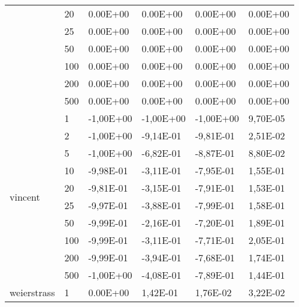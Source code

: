 \begin{longtable}[c]{|m{3.5cm}|l|l|l|l|l|}
                                        & 20        & 0.00E+00   & 0.00E+00   & 0.00E+00   & 0.00E+00  \\ \cline{2-6} 
                                        & 25        & 0.00E+00   & 0.00E+00   & 0.00E+00   & 0.00E+00  \\ \cline{2-6} 
                                        & 50        & 0.00E+00   & 0.00E+00   & 0.00E+00   & 0.00E+00  \\ \cline{2-6} 
                                        & 100       & 0.00E+00   & 0.00E+00   & 0.00E+00   & 0.00E+00  \\ \cline{2-6} 
                                        & 200       & 0.00E+00   & 0.00E+00   & 0.00E+00   & 0.00E+00  \\ \cline{2-6} 
                                        & 500       & 0.00E+00   & 0.00E+00   & 0.00E+00   & 0.00E+00  \\ \hline
\multirow{10}{*}{vincent}               & 1         & -1,00E+00  & -1,00E+00  & -1,00E+00  & 9,70E-05  \\ \cline{2-6} 
                                        & 2         & -1,00E+00  & -9,14E-01  & -9,81E-01  & 2,51E-02  \\ \cline{2-6} 
                                        & 5         & -1,00E+00  & -6,82E-01  & -8,87E-01  & 8,80E-02  \\ \cline{2-6} 
                                        & 10        & -9,98E-01  & -3,11E-01  & -7,95E-01  & 1,55E-01  \\ \cline{2-6} 
                                        & 20        & -9,81E-01  & -3,15E-01  & -7,91E-01  & 1,53E-01  \\ \cline{2-6} 
                                        & 25        & -9,97E-01  & -3,88E-01  & -7,99E-01  & 1,58E-01  \\ \cline{2-6} 
                                        & 50        & -9,99E-01  & -2,16E-01  & -7,20E-01  & 1,89E-01  \\ \cline{2-6} 
                                        & 100       & -9,99E-01  & -3,11E-01  & -7,71E-01  & 2,05E-01  \\ \cline{2-6} 
                                        & 200       & -9,99E-01  & -3,94E-01  & -7,68E-01  & 1,74E-01  \\ \cline{2-6} 
                                        & 500       & -1,00E+00  & -4,08E-01  & -7,89E-01  & 1,44E-01  \\ \hline
\multirow{10}{*}{weierstrass}           & 1         & 0.00E+00   & 1,42E-01   & 1,76E-02   & 3,22E-02  \\ \cline{2-6} 

\end{longtable}
